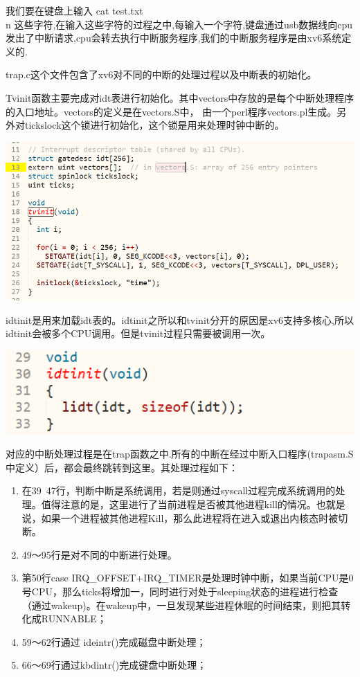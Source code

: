 我们要在键盘上输入 cat test.txt \\n 这些字符,在输入这些字符的过程之中,每输入一个字符,键盘通过usb数据线向cpu发出了中断请求,cpu会转去执行中断服务程序,我们的中断服务程序是由xv6系统定义的.

trap.c这个文件包含了xv6对不同的中断的处理过程以及中断表的初始化。

Tvinit函数主要完成对idt表进行初始化。其中vectors中存放的是每个中断处理程序的入口地址。vectors的定义是在vectors.S中， 由一个perl程序vectors.pl生成。另外对tickslock这个锁进行初始化，这个锁是用来处理时钟中断的。

\includegraphics[width=6in]{figures/input/image1.png}

idtinit是用来加载idt表的。idtinit之所以和tvinit分开的原因是xv6支持多核心,所以idtinit会被多个CPU调用。但是tvinit过程只需要被调用一次。

\includegraphics[width=6in]{figures/input/image2.png}

对应的中断处理过程是在trap函数之中.所有的中断在经过中断入口程序(trapasm.S中定义）后，都会最终跳转到这里。其处理过程如下：

  \begin{enumerate}
  \item 在39~47行，判断中断是系统调用，若是则通过syscall过程完成系统调用的处理。值得注意的是，这里进行了当前进程是否被其他进程kill的情况。也就是说，如果一个进程被其他进程Kill，那么此进程将在进入或退出内核态时被切断。
  \item 49～95行是对不同的中断进行处理。
  \item 第50行case IRQ\_OFFSET+IRQ\_TIMER是处理时钟中断，如果当前CPU是0号CPU，那么ticks将增加一，同时进行对处于sleeping状态的进程进行检查（通过wakeup)。在wakeup中，一旦发现某些进程休眠的时间结束，则把其转化成RUNNABLE；
  \item 59～62行通过 ideintr()完成磁盘中断处理；
  \item 66～69行通过kbdintr()完成键盘中断处理；
  \end{enumerate}

